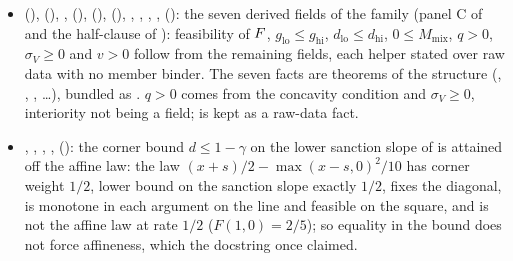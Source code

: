 \begin{itemize}[leftmargin=1.4em,itemsep=1pt]
\item {} (),  (), ,  (),  (),  (), , , , ,  (): the seven derived fields of the family (panel C of  and the half-clause of ): feasibility of $F$, $g_{\mathrm{lo}}\le g_{\mathrm{hi}}$, $d_{\mathrm{lo}}\le d_{\mathrm{hi}}$, $0\le M_{\mathrm{mix}}$, $q>0$, $\sigma_V\ge0$ and $v>0$ follow from the remaining fields, each helper stated over raw data with no member binder. The seven facts are theorems of the structure (, , , \ldots), bundled as . $q>0$ comes from the concavity condition and $\sigma_V\ge0$, interiority not being a field;  is kept as a raw-data fact.
\item {}, , , ,  (): the corner bound $d\le1-\gamma$ on the lower sanction slope of  is attained off the affine law: the law $(x+s)/2-\max(x-s,0)^2/10$ has corner weight $1/2$, lower bound on the sanction slope exactly $1/2$, fixes the diagonal, is monotone in each argument on the line and feasible on the square, and is not the affine law at rate $1/2$ ($F(1,0)=2/5$); so equality in the bound does not force affineness, which the docstring once claimed.

\end{itemize}
